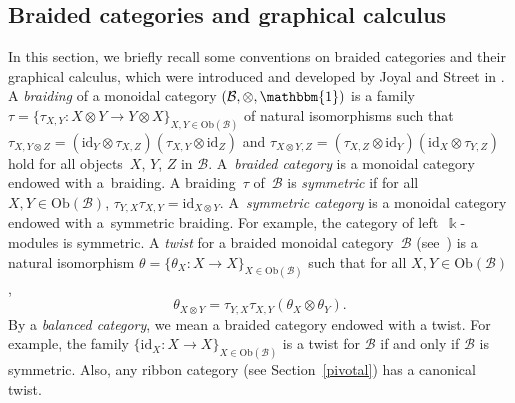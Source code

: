 \documentclass[pdftex]{sigma}
\numberwithin{equation}{section}
\newcommand{\co}{\colon}
\newcommand{\tens}{\otimes}
\newcommand{\id}{\mathrm{id}}
\newcommand{\mc}{\mathcal}
\newcommand{\Ob}[1]{\mathrm{Ob}(#1)}
\newcommand{\kk}{\Bbbk}
\newcommand{\uu}{\mathbbm{1}}
\begin{document}
\subsection{Braided categories and graphical calculus} \label{braidedcats}

In this section, we briefly recall some conventions on braided categories and their graphical calculus, which were introduced and developed by Joyal and Street in \cite{joyal1985braided, joyal1986braided, joyal1991geometry}.
A \textit{braiding} of a monoidal category $(\mc B, \tens, \uu)$ is a family~$\tau=\{\tau_{X,Y}\co X\tens Y \to Y\tens X\}_{X,Y\in \Ob{\mc B}}$ of natural isomorphisms such that $\tau_{X,Y\tens Z}= (\id_Y \tens \tau_{X,Z})(\tau_{X,Y} \tens \id_Z)$ and $\tau_{X\tens Y, Z}= (\tau_{X,Z} \tens \id_Y)(\id_X \tens \tau_{Y,Z})$ hold for all objects~$X$, $Y$, $Z$ in $\mc B$.
A~\textit{braided category} is a monoidal category endowed with a~braiding. A braiding~$\tau$ of~$\mc B$ is \textit{symmetric} if for all~$X,Y \in \Ob{\mc B}$, $\tau_{Y,X}\tau_{X,Y}=\id_{X\tens Y}$.
A~\textit{symmetric category} is a monoidal category endowed with a~symmetric braiding. For example, the category of left~$\kk$-modules is symmetric.
A \textit{twist} for a braided monoidal category~$\mc B$ (see~\cite{shum1994tortile}) is a natural isomorphism $\theta=\{\theta_X \co X \to X\}_{X \in \Ob{\mc B}}$ such that for all $X,Y \in \Ob{\mc B}$,
\begin{equation*} %
\theta_{X\tens Y}= \tau_{Y,X}\tau_{X,Y} (\theta_X \tens \theta_Y).
\end{equation*}
By a \textit{balanced category}, we mean a braided category endowed with a twist. For example, the family $\{\id_X\co X \to X\}_{X\in \Ob{\mc B}}$ is a twist for $\mc B$ if and only if $\mc B$ is symmetric. Also, any ribbon category (see Section~\ref{pivotal}) has a canonical twist.
\end{document}
